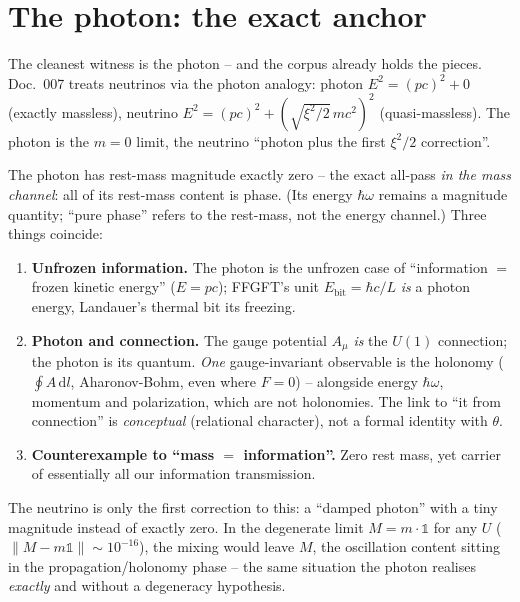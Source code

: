 \section{The photon: the exact anchor}
The cleanest witness is the photon -- and the corpus already holds the pieces. Doc.~007 treats neutrinos
via the photon analogy: photon $E^2=(pc)^2+0$ (exactly massless), neutrino
$E^2=(pc)^2+(\sqrt{\xi^2/2}\,mc^2)^2$ (quasi-massless). The photon is the $m=0$ limit, the neutrino
\enquote{photon plus the first $\xi^2/2$ correction}.

The photon has rest-mass magnitude exactly zero -- the exact all-pass \emph{in the mass channel}: all of its rest-mass content is phase. (Its energy $\hbar\omega$ remains a magnitude quantity; \enquote{pure phase} refers to the rest-mass, not the energy channel.) Three
things coincide:
\begin{enumerate}
  \item \textbf{Unfrozen information.} The photon is the unfrozen case of \enquote{information $=$ frozen
        kinetic energy} ($E=pc$); FFGFT's unit $E_\text{bit}=\hbar c/L$ \emph{is} a photon energy,
        Landauer's thermal bit its freezing.
  \item \textbf{Photon and connection.} The gauge potential $A_\mu$ \emph{is} the $U(1)$ connection; the
        photon is its quantum. \emph{One} gauge-invariant observable is the holonomy ($\oint A\,\mathrm{d}l$,
        Aharonov-Bohm, even where $F=0$) -- alongside energy $\hbar\omega$, momentum and polarization,
        which are not holonomies. The link to \enquote{it from connection} is \emph{conceptual}
        (relational character), not a formal identity with $\theta$.
  \item \textbf{Counterexample to \enquote{mass $=$ information}.} Zero rest mass, yet carrier of
        essentially all our information transmission.
\end{enumerate}

The neutrino is only the first correction to this: a \enquote{damped photon} with a tiny magnitude
instead of exactly zero. In the degenerate limit $M=m\cdot\mathbb{1}$ for any $U$
($\lVert M-m\mathbb{1}\rVert\sim10^{-16}$), the mixing would leave $M$, the oscillation content sitting in
the propagation/holonomy phase -- the same situation the photon realises \emph{exactly} and without a
degeneracy hypothesis.


